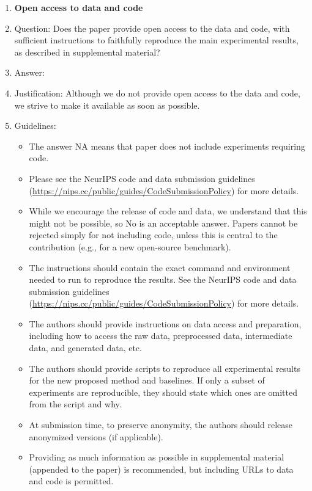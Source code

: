 \documentclass{article} %
\newcounter{ct}
\theoremstyle{definition}
\theoremstyle{remark}
\begin{document}
\begin{enumerate}
\item {\bf Open access to data and code}
    \item[] Question: Does the paper provide open access to the data and code, with sufficient instructions to faithfully reproduce the main experimental results, as described in supplemental material?
    \item[] Answer: \answerNo{} %
    \item[] Justification: Although we do not provide open access to the data and code, we strive to make it available as soon as possible.
    \item[] Guidelines:
    \begin{itemize}
        \item The answer NA means that paper does not include experiments requiring code.
        \item Please see the NeurIPS code and data submission guidelines (\url{https://nips.cc/public/guides/CodeSubmissionPolicy}) for more details.
        \item While we encourage the release of code and data, we understand that this might not be possible, so No is an acceptable answer. Papers cannot be rejected simply for not including code, unless this is central to the contribution (e.g., for a new open-source benchmark).
        \item The instructions should contain the exact command and environment needed to run to reproduce the results. See the NeurIPS code and data submission guidelines (\url{https://nips.cc/public/guides/CodeSubmissionPolicy}) for more details.
        \item The authors should provide instructions on data access and preparation, including how to access the raw data, preprocessed data, intermediate data, and generated data, etc.
        \item The authors should provide scripts to reproduce all experimental results for the new proposed method and baselines. If only a subset of experiments are reproducible, they should state which ones are omitted from the script and why.
        \item At submission time, to preserve anonymity, the authors should release anonymized versions (if applicable).
        \item Providing as much information as possible in supplemental material (appended to the paper) is recommended, but including URLs to data and code is permitted.
    \end{itemize}



\end{enumerate}
\end{document}
